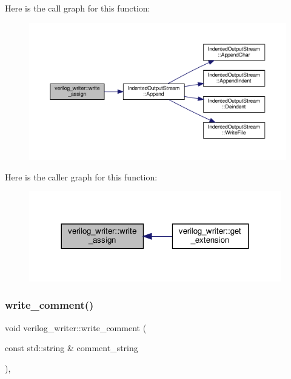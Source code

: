 Here is the call graph for this function\+:
\nopagebreak
\begin{figure}[H]
\begin{center}
\leavevmode
\includegraphics[width=350pt]{d8/dba/classverilog__writer_a67bc3c89705a8863735409e64aa8cf32_cgraph}
\end{center}
\end{figure}
Here is the caller graph for this function\+:
\nopagebreak
\begin{figure}[H]
\begin{center}
\leavevmode
\includegraphics[width=311pt]{d8/dba/classverilog__writer_a67bc3c89705a8863735409e64aa8cf32_icgraph}
\end{center}
\end{figure}
\mbox{\label{classverilog__writer_ab013209d73c10f53c87bb1b7a2666ff0}} 
\subsubsection{\texorpdfstring{write\+\_\+comment()}{write\_comment()}}
{\footnotesize\ttfamily void verilog\+\_\+writer\+::write\+\_\+comment (\begin{DoxyParamCaption}\item[{const std\+::string \&}]{comment\+\_\+string }\end{DoxyParamCaption})\hspace{0.3cm}{\ttfamily [override]}, {\ttfamily [virtual]}}



